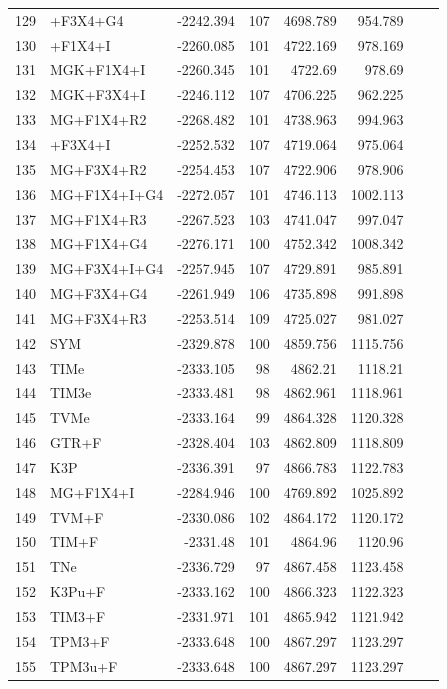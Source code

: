 \documentclass[12pt]{article}
\begin{document}
\begin{longtable}{clrrrrrr}
	129 & \gy+F3X4+G4 & -2242.394 & 107 & 4698.789 & 954.789 \\ 
	130 & \gy+F1X4+I & -2260.085 & 101 & 4722.169 & 978.169 \\ 
	131 & MGK+F1X4+I & -2260.345 & 101 & 4722.69 & 978.69 \\ 
	132 & MGK+F3X4+I & -2246.112 & 107 & 4706.225 & 962.225 \\ 
	133 & MG+F1X4+R2 & -2268.482 & 101 & 4738.963 & 994.963 \\ 
	134 & \gy+F3X4+I & -2252.532 & 107 & 4719.064 & 975.064 \\ 
	135 & MG+F3X4+R2 & -2254.453 & 107 & 4722.906 & 978.906 \\ 
	136 & MG+F1X4+I+G4 & -2272.057 & 101 & 4746.113 & 1002.113 \\ 
	137 & MG+F1X4+R3 & -2267.523 & 103 & 4741.047 & 997.047 \\ 
	138 & MG+F1X4+G4 & -2276.171 & 100 & 4752.342 & 1008.342 \\ 
	139 & MG+F3X4+I+G4 & -2257.945 & 107 & 4729.891 & 985.891 \\ 
	140 & MG+F3X4+G4 & -2261.949 & 106 & 4735.898 & 991.898 \\ 
	141 & MG+F3X4+R3 & -2253.514 & 109 & 4725.027 & 981.027 \\ 
	142 & SYM & -2329.878 & 100 & 4859.756 & 1115.756 \\ 
	143 & TIMe & -2333.105 & 98 & 4862.21 & 1118.21 \\ 
	144 & TIM3e & -2333.481 & 98 & 4862.961 & 1118.961 \\ 
	145 & TVMe & -2333.164 & 99 & 4864.328 & 1120.328 \\ 
	146 & GTR+F & -2328.404 & 103 & 4862.809 & 1118.809 \\ 
	147 & K3P & -2336.391 & 97 & 4866.783 & 1122.783 \\ 
	148 & MG+F1X4+I & -2284.946 & 100 & 4769.892 & 1025.892 \\ 
	149 & TVM+F & -2330.086 & 102 & 4864.172 & 1120.172 \\ 
	150 & TIM+F & -2331.48 & 101 & 4864.96 & 1120.96 \\ 
	151 & TNe & -2336.729 & 97 & 4867.458 & 1123.458 \\ 
	152 & K3Pu+F & -2333.162 & 100 & 4866.323 & 1122.323 \\ 
	153 & TIM3+F & -2331.971 & 101 & 4865.942 & 1121.942 \\ 
	154 & TPM3+F & -2333.648 & 100 & 4867.297 & 1123.297 \\ 
	155 & TPM3u+F & -2333.648 & 100 & 4867.297 & 1123.297 \\ 

\end{longtable}
\end{document}

